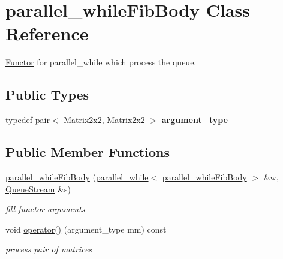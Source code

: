 \hypertarget{classparallel__whileFibBody}{}\section{parallel\+\_\+while\+Fib\+Body Class Reference}
\label{classparallel__whileFibBody}


\hyperlink{structFunctor}{Functor} for parallel\+\_\+while which process the queue.  


\subsection*{Public Types}
\begin{DoxyCompactItemize}
\item 
\hypertarget{classparallel__whileFibBody_a06899416a89cde2cbf2b147170cf4753}{}typedef pair$<$ \hyperlink{structMatrix2x2}{Matrix2x2}, \hyperlink{structMatrix2x2}{Matrix2x2} $>$ {\bfseries argument\+\_\+type}\label{classparallel__whileFibBody_a06899416a89cde2cbf2b147170cf4753}

\end{DoxyCompactItemize}
\subsection*{Public Member Functions}
\begin{DoxyCompactItemize}
\item 
\hypertarget{classparallel__whileFibBody_a60bf0add1d243947df505bceb0fab93d}{}\hyperlink{classparallel__whileFibBody_a60bf0add1d243947df505bceb0fab93d}{parallel\+\_\+while\+Fib\+Body} (\hyperlink{classtbb_1_1parallel__while}{parallel\+\_\+while}$<$ \hyperlink{classparallel__whileFibBody}{parallel\+\_\+while\+Fib\+Body} $>$ \&w, \hyperlink{structQueueStream}{Queue\+Stream} \&s)\label{classparallel__whileFibBody_a60bf0add1d243947df505bceb0fab93d}

\begin{DoxyCompactList}\small\item\em fill functor arguments \end{DoxyCompactList}\item 
\hypertarget{classparallel__whileFibBody_a782d2208ade53ef03da9fe2335e1b3bb}{}void \hyperlink{classparallel__whileFibBody_a782d2208ade53ef03da9fe2335e1b3bb}{operator()} (argument\+\_\+type mm) const \label{classparallel__whileFibBody_a782d2208ade53ef03da9fe2335e1b3bb}

\begin{DoxyCompactList}\small\item\em process pair of matrices \end{DoxyCompactList}\end{DoxyCompactItemize}


